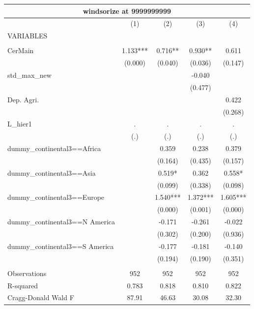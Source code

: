 \documentclass[12pt,a4paper]{article}
\begin{document}
\begin{tabular}{lcccc}
\multicolumn{5}{c}{windsorize at 9999999999} \\ \hline
 & (1) & (2) & (3) & (4) \\
VARIABLES &  &  &  &  \\ \hline
 &  &  &  &  \\
CerMain & 1.133*** & 0.716** & 0.930** & 0.611 \\
 & (0.000) & (0.040) & (0.036) & (0.147) \\
std\_max\_new &  &  & -0.040 &  \\
 &  &  & (0.477) &  \\
Dep. Agri. &  &  &  & 0.422 \\
 &  &  &  & (0.268) \\
L\_hier1 & . & . & . & . \\
 & (.) & (.) & (.) & (.) \\
dummy\_continental3==Africa &  & 0.359 & 0.238 & 0.379 \\
 &  & (0.164) & (0.435) & (0.157) \\
dummy\_continental3==Asia &  & 0.519* & 0.362 & 0.558* \\
 &  & (0.099) & (0.338) & (0.098) \\
dummy\_continental3==Europe &  & 1.540*** & 1.372*** & 1.605*** \\
 &  & (0.000) & (0.001) & (0.000) \\
dummy\_continental3==N America &  & -0.171 & -0.261 & -0.022 \\
 &  & (0.302) & (0.200) & (0.936) \\
dummy\_continental3==S America &  & -0.177 & -0.181 & -0.140 \\
 &  & (0.194) & (0.190) & (0.351) \\
 &  &  &  &  \\
Observations & 952 & 952 & 952 & 952 \\
R-squared & 0.783 & 0.818 & 0.810 & 0.822 \\
 Cragg-Donald Wald F & 87.91 & 46.63 & 30.08 & 32.30 \\ \hline
\end{tabular}
\end{document}
